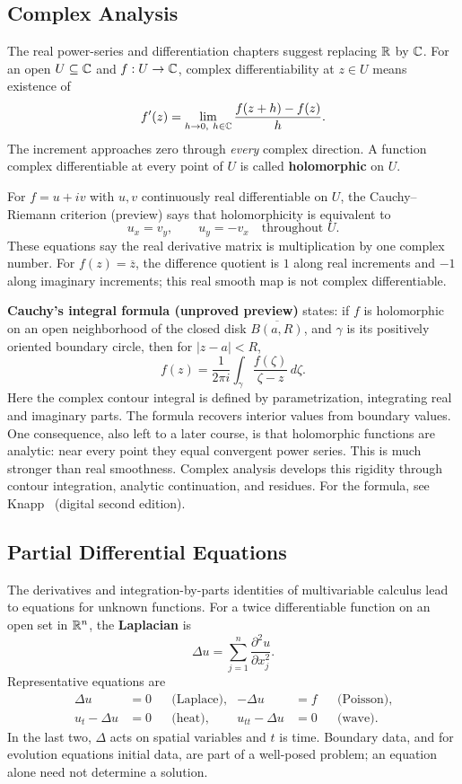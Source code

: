\subsection*{Complex Analysis}

The real power-series and differentiation chapters suggest replacing $\mathbb{R}$
by $\mathbb{C}$. For an open $U\subseteq\mathbb{C}$ and $f:U\to\mathbb{C}$, complex
differentiability at $z\in U$ means existence of
\[
f'(z)=\lim_{h\to0,\ h\in\C}\frac{f(z+h)-f(z)}h.
\]
The increment approaches zero through \emph{every} complex direction. A
function complex differentiable at every point of $U$ is called
\textbf{holomorphic} on $U$.

For $f=u+iv$ with $u,v$ continuously real differentiable on $U$, the
Cauchy--Riemann criterion (preview) says that holomorphicity is equivalent to
\[
u_x=v_y,\qquad u_y=-v_x\quad\text{throughout }U.
\]
These equations say the real derivative matrix is multiplication by one
complex number. For $f(z)=\overline z$, the difference quotient is $1$
along real increments and $-1$ along imaginary increments; this real
smooth map is not complex differentiable.

\textbf{Cauchy's integral formula (unproved preview)} states: if $f$ is
holomorphic on an open neighborhood of the closed disk
$\overline{B(a,R)}$, and $\gamma$ is its positively oriented boundary circle,
then for $|z-a|<R$,
\[
\boxed{f(z)=\frac{1}{2\pi i}\int_\gamma
\frac{f(\zeta)}{\zeta-z}\,d\zeta.}
\]
Here the complex contour integral is defined by parametrization, integrating
real and imaginary parts. The formula recovers interior values from boundary
values. One consequence, also left to a later course, is that holomorphic
functions are analytic: near every point they equal convergent power series.
This is much stronger than real smoothness. Complex analysis develops this
rigidity through contour integration, analytic continuation, and residues.
For the formula, see Knapp~\cite[Appendix~B, \S B4]{knapp-basic-real}
(digital second edition).

\subsection*{Partial Differential Equations}

The derivatives and integration-by-parts identities of multivariable
calculus lead to equations for unknown functions. For a twice differentiable
function on an open set in $\mathbb{R}^n$, the \textbf{Laplacian} is
\[
\Delta u=\sum_{j=1}^n\frac{\partial^2u}{\partial x_j^2}.
\]
Representative equations are
\[
\begin{aligned}
\Delta u&=0 &&\text{(Laplace)},&-\Delta u&=f &&\text{(Poisson)},\\
u_t-\Delta u&=0 &&\text{(heat)},&u_{tt}-\Delta u&=0 &&\text{(wave)}.
\end{aligned}
\]
In the last two, $\Delta$ acts on spatial variables and $t$ is time.
Boundary data, and for evolution equations initial data, are part of a
well-posed problem; an equation alone need not determine a solution.


